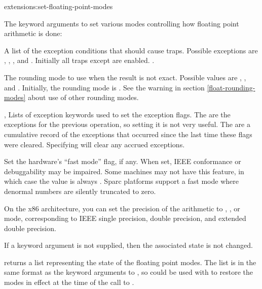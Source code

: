 \begin{defun}{extensions:}{set-floating-point-modes}{%
    }
  
  The keyword arguments to  set various
  modes controlling how floating point arithmetic is done:
  \begin{Lentry}
  
  \item[\kwd{traps}] A list of the exception conditions that should
    cause traps.  Possible exceptions are ,
    , ,  and
    .  Initially all traps except 
    are enabled.  .
    
  \item[\kwd{rounding-mode}] The rounding mode to use when the result
    is not exact. Possible values are ,
    ,  and .
    Initially, the rounding mode is . See the warning in
    section \ref{float-rounding-modes} about use of other rounding
    modes.
  
  \item[\kwd{current-exceptions}, \kwd{accrued-exceptions}] Lists of
    exception keywords used to set the exception flags.  The
     are the exceptions for the previous
    operation, so setting it is not very useful.  The
     are a cumulative record of the exceptions
    that occurred since the last time these flags were cleared.
    Specifying \code{()} will clear any accrued exceptions.
  
  \item[\kwd{fast-mode}] Set the hardware's ``fast mode'' flag, if
    any.  When set, IEEE conformance or debuggability may be impaired.
    Some machines may not have this feature, in which case the value
    is always \false.  Sparc platforms support a fast mode where
    denormal numbers are silently truncated to zero.
  \item[\kwd{precision-control}] On the x86 architecture, you can set
    the precision of the arithmetic to , , or
     mode, corresponding to IEEE single precision, double
    precision, and extended double precision.
  \end{Lentry}
  If a keyword argument is not supplied, then the associated state is
  not changed.
  
   returns a list representing the
  state of the floating point modes.  The list is in the same format
  as the keyword arguments to , so
   could be used with  to
  restore the modes in effect at the time of the call to
  .
\end{defun}

